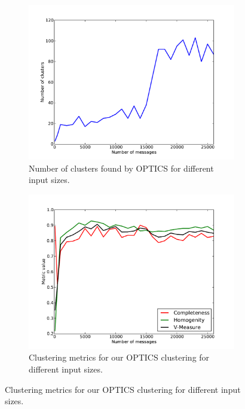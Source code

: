 \documentclass[a4paper]{report}
\begin{document}
\begin{figure}[h]
    \centering
    \begin{subfigure}[t]{0.48\textwidth}
        \includegraphics[width=\textwidth]{img/num_optics}
        \caption{Number of clusters found by OPTICS for different input sizes.}
        \label{fig:num_optics}
    \end{subfigure}
    \quad
    \begin{subfigure}[t]{0.48\textwidth}
        \includegraphics[width=\textwidth]{img/metrics_optics}
        \caption{Clustering metrics for our OPTICS clustering for different
            input sizes.}
        \label{fig:metrics_optics}
    \end{subfigure}
    \label{fig:optics_res}
\end{figure}
\end{document}

